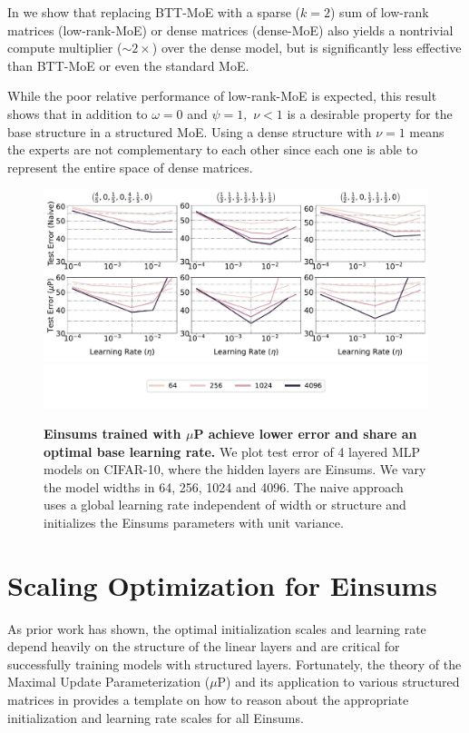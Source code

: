 \documentclass{article}
\begin{document}
In  we show that replacing BTT-MoE with a sparse ($k=2$) sum of low-rank matrices (low-rank-MoE) or dense
matrices (dense-MoE) also yields a nontrivial compute multiplier ($\sim2\times$) over the dense model, but is significantly
less effective than BTT-MoE or even the standard MoE.

While the poor relative performance of low-rank-MoE is expected, this result shows that in addition to $\omega=0$ and $\psi=1,$ $\nu < 1$ is a desirable property for the base structure in a structured MoE. Using a dense structure with $\nu = 1$ means the experts are not complementary to each other since each one is able to represent the entire space of dense matrices.


\begin{figure}[!b]
\centering
    \includegraphics[width=0.8\linewidth]{figs/lr_landscape.pdf}
    \\
    \vspace{-1.7mm}
    \includegraphics[width=0.9\linewidth]{figs/lr_landscape_legend.pdf}
    \vspace{-5mm}
   \caption{
     \textbf{Einsums trained with $\mu$P achieve lower error and share an optimal base learning rate.}
     We plot test error of 4 layered MLP models on CIFAR-10, where the hidden layers are Einsums.
     We vary the model widths in 64, 256, 1024 and 4096. The naive approach uses a global learning rate independent of width or structure and initializes the Einsums parameters with unit variance.
   }
    \label{fig:lr_landscapes}
    \vspace{-5mm}
\end{figure}

\section{Scaling Optimization for Einsums}\label{sec:opt}
As prior work \citep{qiu2024compute} has shown, the optimal initialization scales and learning rate depend heavily on the structure of the linear layers and are critical for successfully training models with structured layers.
Fortunately, the theory of the Maximal Update Parameterization ($\mu$P) \citep{yang2021infty,yang2023iv,yang2021v} and
its application to various structured matrices in \citet{qiu2024compute} provides a template on how to reason about the
appropriate initialization and learning rate scales for all Einsums.
\end{document}
